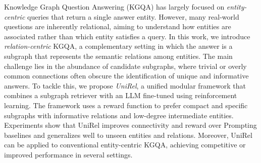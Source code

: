  Knowledge Graph Question Answering (KGQA) has largely focused on \textit{entity-centric} queries that return a single answer entity. However, many real-world questions are inherently relational, aiming to understand how entities are associated rather than which entity satisfies a query.
In this work, we introduce \textit{relation-centric} KGQA, a complementary setting in which the answer is a subgraph that represents the semantic relations among entities. The main challenge lies in the abundance of candidate subgraphs, where trivial or overly common connections often obscure the identification of unique and informative answers. 
To tackle this, we propose \textit{UniRel}, a unified modular framework that combines a subgraph retriever with an LLM fine-tuned using reinforcement learning. The framework uses a reward function to prefer compact and specific subgraphs with informative relations and low-degree intermediate entities.
Experiments show that UniRel improves connectivity and reward over Prompting baselines and generalizes well to unseen entities and relations. Moreover, UniRel can be applied to conventional entity-centric KGQA, achieving competitive or improved performance in several settings.










